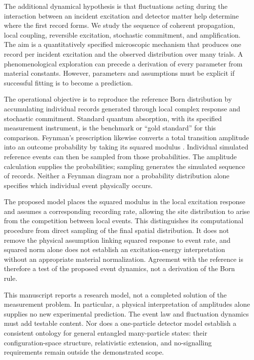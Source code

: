 \documentclass[11pt]{article}
\begin{document}
The additional dynamical hypothesis is that fluctuations acting during the interaction between an incident excitation and detector matter help determine where the first record forms. We study the sequence of coherent propagation, local coupling, reversible excitation, stochastic commitment, and amplification. The aim is a quantitatively specified microscopic mechanism that produces one record per incident excitation and the observed distribution over many trials. A phenomenological exploration can precede a derivation of every parameter from material constants. However, parameters and assumptions must be explicit if successful fitting is to become a prediction.

The operational objective is to reproduce the reference Born distribution by accumulating individual records generated through local complex response and stochastic commitment. Standard quantum absorption, with its specified measurement instrument, is the benchmark or ``gold standard'' for this comparison. Feynman's prescription likewise converts a total transition amplitude into an outcome probability by taking its squared modulus \cite{feynman}. Individual simulated reference events can then be sampled from those probabilities. The amplitude calculation supplies the probabilities; sampling generates the simulated sequence of records. Neither a Feynman diagram nor a probability distribution alone specifies which individual event physically occurs.

The proposed model places the squared modulus in the local excitation response and assumes a corresponding recording rate, allowing the site distribution to arise from the competition between local events. This distinguishes its computational procedure from direct sampling of the final spatial distribution. It does not remove the physical assumption linking squared response to event rate, and squared norm alone does not establish an excitation-energy interpretation without an appropriate material normalization. Agreement with the reference is therefore a test of the proposed event dynamics, not a derivation of the Born rule.

This manuscript reports a research model, not a completed solution of the measurement problem. In particular, a physical interpretation of amplitudes alone supplies no new experimental prediction. The event law and fluctuation dynamics must add testable content. Nor does a one-particle detector model establish a consistent ontology for general entangled many-particle states: their configuration-space structure, relativistic extension, and no-signalling requirements remain outside the demonstrated scope.
\end{document}
